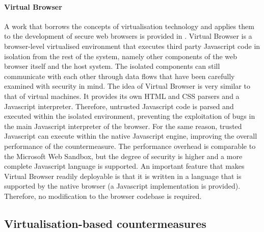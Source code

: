 \paragraph{Virtual Browser}
A work that borrows the concepts of virtualisation technology and applies them to the development of secure web browsers is provided in \cite{virtualbrowser}. Virtual Browser is a browser-level virtualised environment that executes third party Javascript code in isolation from the rest of the system, namely other components of the web browser itself and the host system. The isolated components can still communicate with each other through data flows that have been carefully examined with security in mind. 
The idea of Virtual Browser is very similar to that of virtual machines. It provides its own HTML and CSS parsers and a Javascript interpreter. Therefore, untrusted Javascript code is parsed and executed within the isolated environment, preventing the exploitation of bugs in the main Javascript interpreter of the browser.
For the same reason, trusted Javascript can execute within the native Javascript engine, improving the overall performance of the countermeasure. The performance overhead is comparable to the Microsoft Web Sandbox, but the degree of security is higher and a more complete Javascript language is supported.
An important feature that makes Virtual Browser readily deployable is that it is written in a language that is supported by the native browser (a Javascript implementation is provided). Therefore, no modification to the browser codebase is required.



\subsection{Virtualisation-based countermeasures}\label{virtbased}
